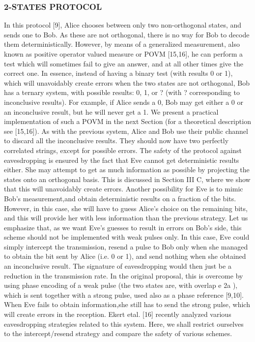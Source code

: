 \subsubsection{2-STATES PROTOCOL}
In this protocol [9], Alice chooses between only two non-orthogonal states, and sends one to Bob. As these are not orthogonal, there is no way for Bob to decode them deterministically. However, by means of a generalized measurement, also known as positive operator valued measure or POVM [15,16], he can perform a test which will sometimes fail to give an answer, and at all other times give the correct one. In essence, instead of having a binary test (with results 0 or 1), which will unavoidably create errors when the two states are not orthogonal, Bob has a ternary system, with possible results: 0, 1, or ? (with ? corresponding to inconclusive results). For example, if Alice sends a 0, Bob may get either a 0 or an inconclusive result, but he will never get a 1. We present a practical implementation of such a POVM in the next Section (for a theoretical description see [15,16]). As with the previous system, Alice and Bob use their public channel to discard all the inconclusive results. They should now have two perfectly correlated strings, except for possible errors. The safety of the protocol against eavesdropping is ensured by the fact that Eve cannot get deterministic results either. She may attempt to get as much information as possible by projecting the states onto an orthogonal basis. This is discussed in Section III C, where we show that this will unavoidably create errors. Another possibility for Eve is to mimic Bob’s measurement,and obtain deterministic results on a fraction of the bits. However, in this case, she will have to guess Alice’s choice on the remaining bits, and this will provide her with less information than the previous strategy. Let us emphasize that, as we want Eve’s guesses to result in errors on Bob’s side, this scheme should not be implemented with weak pulses only. In this case, Eve could simply intercept the transmission, resend a pulse to Bob only when she managed to obtain the bit sent by Alice (i.e. 0 or 1), and send nothing when she obtained an inconclusive result. The signature of eavesdropping would then just be a reduction in the transmission rate. In the original proposal, this is overcome by using phase encoding of a weak pulse (the two states are, with overlap e 2a ), which is sent together with a strong pulse, used also as a phase reference [9,10]. When Eve fails to obtain information,she still has to send the strong pulse, which will create errors in the reception. Ekert etal. [16] recently analyzed various eavesdropping strategies related to this system. Here, we shall restrict ourselves to the intercept/resend strategy and compare the safety of various schemes.

